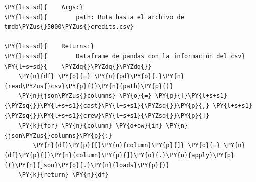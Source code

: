 \begin{tcolorbox}[breakable, size=fbox, boxrule=1pt, pad at break*=1mm,colback=cellbackground, colframe=cellborder]
\begin{Verbatim}[commandchars=\\\{\}]
\PY{l+s+sd}{    Args:}
\PY{l+s+sd}{        path: Ruta hasta el archivo de tmdb\PYZus{}5000\PYZus{}credits.csv}

\PY{l+s+sd}{    Returns:}
\PY{l+s+sd}{        Dataframe de pandas con la información del csv}
\PY{l+s+sd}{    \PYZdq{}\PYZdq{}\PYZdq{}}
    \PY{n}{df} \PY{o}{=} \PY{n}{pd}\PY{o}{.}\PY{n}{read\PYZus{}csv}\PY{p}{(}\PY{n}{path}\PY{p}{)}
    \PY{n}{json\PYZus{}columns} \PY{o}{=} \PY{p}{[}\PY{l+s+s1}{\PYZsq{}}\PY{l+s+s1}{cast}\PY{l+s+s1}{\PYZsq{}}\PY{p}{,} \PY{l+s+s1}{\PYZsq{}}\PY{l+s+s1}{crew}\PY{l+s+s1}{\PYZsq{}}\PY{p}{]}
    \PY{k}{for} \PY{n}{column} \PY{o+ow}{in} \PY{n}{json\PYZus{}columns}\PY{p}{:}
        \PY{n}{df}\PY{p}{[}\PY{n}{column}\PY{p}{]} \PY{o}{=} \PY{n}{df}\PY{p}{[}\PY{n}{column}\PY{p}{]}\PY{o}{.}\PY{n}{apply}\PY{p}{(}\PY{n}{json}\PY{o}{.}\PY{n}{loads}\PY{p}{)}
    \PY{k}{return} \PY{n}{df}
\end{Verbatim}
\end{tcolorbox}

